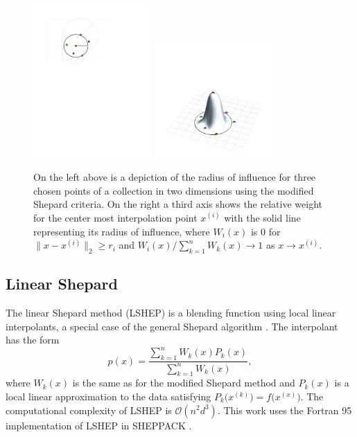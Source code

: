\begin{figure}
  \centering
  \includegraphics[width=0.4\textwidth,]{Figures/NA/example_shepard_radius.pdf}
  \hspace{.2cm}
  \includegraphics[width=0.4\textwidth,]{Figures/NA/example_shepard_weight.pdf}
  \caption{On the left above is a depiction of the radius
    of influence for three chosen points of a collection in two
    dimensions using the modified Shepard criteria. On the right a
    third axis shows the relative weight for the center most
    interpolation point $x^{(i)}$ with the solid line representing its
    radius of influence, where $W_i(x)$ is $0$ for $\|x-x^{(i)}\|_2
    \geq r_i$ and $W_i(x) / \sum_{k=1}^n W_k(x) \to 1$ as $x \to
    x^{(i)}$.
  \vspace{-.1cm}}
  \label{fig:shepard}
\end{figure}


\subsection{Linear Shepard}
The linear Shepard method (LSHEP) is a blending function using local
linear interpolants, a special case of the general Shepard algorithm
\cite{thacker2010algorithm}. The interpolant has the form
 $$ p(x) = \frac{\sum\limits_{k=1}^{n}W_k(x)P_k(x)}
 {\sum\limits_{k=1}^{n}W_k(x)} ,$$
where $W_k(x)$ is the same as for the modified Shepard method and
$P_k(x)$ is a local linear approximation to the data satisfying
$P_k\bigl(x^{(k)}\bigr) = f\bigl(x^{(x)}\bigr)$. The computational
complexity of LSHEP is $\mathcal{O}(n^2d^3)$. This work uses the
Fortran 95 implementation of LSHEP in SHEPPACK
\cite{thacker2010algorithm}.
